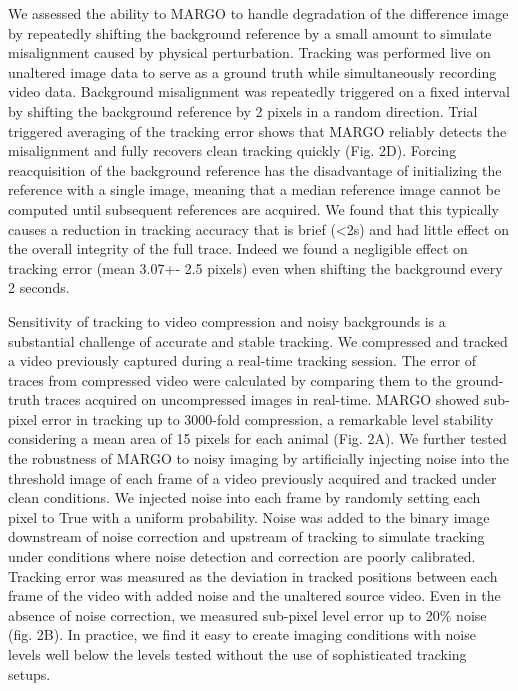 \documentclass[10pt]{article}
\begin{document}
\begin{multicols}{2}
We assessed the ability to MARGO to handle degradation of the difference image by repeatedly shifting the background reference by a small amount to simulate misalignment caused by physical perturbation. Tracking was performed live on unaltered image data to serve as a ground truth while simultaneously recording video data. Background misalignment was repeatedly triggered on a fixed interval by shifting the background reference by 2 pixels in a random direction. Trial triggered averaging of the tracking error shows that MARGO reliably detects the misalignment and fully recovers clean tracking quickly (Fig. 2D). Forcing reacquisition of the background reference has the disadvantage of initializing the reference with a single image, meaning that a median reference image cannot be computed until subsequent references are acquired. We found that this typically causes a reduction in tracking accuracy that is brief (<2s) and had little effect on the overall integrity of the full trace. Indeed we found a negligible effect on tracking error (mean 3.07+- 2.5 pixels) even when shifting the background every 2 seconds.

Sensitivity of tracking to video compression and noisy backgrounds is a substantial challenge of accurate and stable tracking. We compressed and tracked a video previously captured during a real-time tracking session. The error of traces from compressed video were calculated by comparing them to the ground-truth traces acquired on uncompressed images in real-time. MARGO showed sub-pixel error in tracking up to 3000-fold compression, a remarkable level stability considering a mean area of 15 pixels for each animal (Fig. 2A). We further tested the robustness of MARGO to noisy imaging by artificially injecting noise into the threshold image of each frame of a video previously acquired and tracked under clean conditions. We injected noise into each frame by randomly setting each pixel to True with a uniform probability. Noise was added to the binary image downstream of noise correction and upstream of tracking to simulate tracking under conditions where noise detection and correction are poorly calibrated. Tracking error was measured as the deviation in tracked positions between each frame of the video with added noise and the unaltered source video.  Even in the absence of noise correction, we measured sub-pixel level error up to 20\% noise (fig. 2B). In practice, we find it easy to create imaging conditions with noise levels well below the levels tested without the use of sophisticated tracking setups.


\end{multicols}
\end{document}
